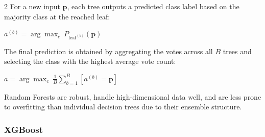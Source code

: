\documentclass[bst/sn-nature]{sn-jnl}
\begin{document}
\begin{multicols}{2}
For a new input $\mathbf{p}$, each tree outputs a predicted class label based on the majority class at the reached leaf: \\

\begin{center}
    $a^{(b)} = \arg\max_c\ P_{\text{leaf}^{(b)}}(\mathbf{p})$ \vspace{0.3cm}
\end{center}

The final prediction is obtained by aggregating the votes across all $B$ trees and selecting the class with the highest average vote count: \\ 

\begin{center}
    $a = \arg\max_c\ \frac{1}{B} \sum_{b=1}^{B} [a^{(b)} = \mathbf{p}]$ \vspace{0.3cm}
\end{center}

Random Forests are robust, handle high-dimensional data well, and are less prone to overfitting than individual decision trees due to their ensemble structure.

\subsubsection{XGBoost\cite{xgboost}}


\end{multicols}
\end{document}
